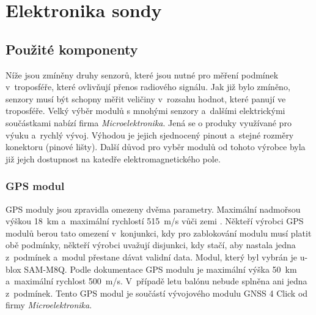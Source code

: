 \documentclass[twoside]{ctuthesis}
\theoremstyle{plain}
\theoremstyle{definition}
\theoremstyle{note}
\begin{document}
	\section{Elektronika sondy}

		\subsection{Použité komponenty}
		Níže jsou zmíněny druhy senzorů, které jsou nutné pro měření podmínek v~troposféře, které ovlivňují přenos radiového signálu. Jak již bylo zmíněno, senzory musí být schopny měřit veličiny v~rozsahu hodnot, které panují ve troposféře. Velký výběr modulů s mnohými senzory a~dalšími elektrickými součástkami nabízí firma \textit{Microelektronika}. Jená se o produky využívané pro výuku a~rychlý vývoj. Výhodou je jejich sjednocený pinout a~stejné rozměry konektoru (pinové lišty). Další důvod pro vyběr modulů od tohoto výrobce byla již jejch dostupnost na katedře elektromagnetického pole.

			\subsubsection{GPS modul}
			GPS moduly jsou zpravidla omezeny dvěma parametry. Maximální nadmořsou výškou 18~km a~maximální rychlostí 515~m/s vůči zemi . Někteří výrobci GPS modulů berou tato omezení v~konjunkci, kdy pro zablokování modulu musí platit obě podmínky, někteří výrobci uvažují  disjunkci, kdy stačí, aby nastala jedna z~podmínek a~modul přestane dávat validní data. Modul, který byl vybrán je u-blox SAM-M8Q. Podle dokumentace GPS modulu \cite{dsh_gps} je maximální výška 50~km a~maximální rychlost 500~m/s. V~případě letu balónu nebude splněna ani jedna z~podmínek. Tento GPS modul je součástí vývojového modulu GNSS 4 Click od firmy \textit{Microelektronika}.
\end{document}
